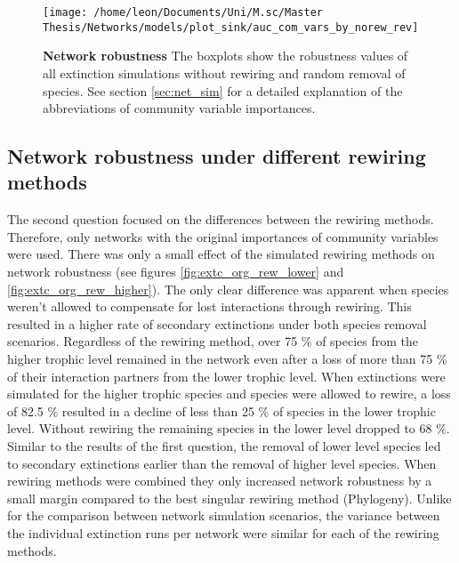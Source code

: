 \documentclass[12pt,a4paper]{article}
\begin{document}
\begin{figure}[H]
	 \centering
	 \texttt{[image: /home/leon/Documents/Uni/M.sc/Master Thesis/Networks/models/plot\_sink/auc\_com\_vars\_by\_norew\_rev]}
	 \captionsetup{width = .8\textwidth}
	 \caption{\textbf{Network robustness } The boxplots show the robustness values of all extinction simulations without rewiring and random removal of species. See section \ref{sec:net_sim} for a detailed explanation of the abbreviations of community variable importances.}
	 \label{fig:auc_cv_norew}
\end{figure}



\subsection{Network robustness under different rewiring methods}

The second question focused on the differences between the rewiring methods. Therefore, only networks with the original importances of community variables were used. There was only a small effect of the simulated rewiring methods on network robustness  (see figures \ref{fig:extc_org_rew_lower} and \ref{fig:extc_org_rew_higher}). The only clear difference was apparent when species weren't allowed to compensate for lost interactions through rewiring. This resulted in a higher rate of secondary extinctions under both species removal scenarios.
Regardless of the rewiring method, over 75 \% of species from the higher trophic level remained in the network even after a loss of more than 75 \% of their interaction partners from the lower trophic level. When extinctions were simulated for the higher trophic species and species were allowed to rewire, a loss of 82.5 \% resulted in a decline of less than 25 \% of species in the lower trophic level. Without rewiring the remaining species in the lower level dropped to 68 \%.\\ Similar to the results of the first question, the removal of lower level species led to secondary extinctions earlier than the removal of higher level species. When rewiring methods were combined they only increased network robustness by a small margin compared to the best singular rewiring method (Phylogeny). Unlike for the comparison between network simulation scenarios, the variance between the individual extinction runs per network were similar for each of the rewiring methods. 
\end{document}
